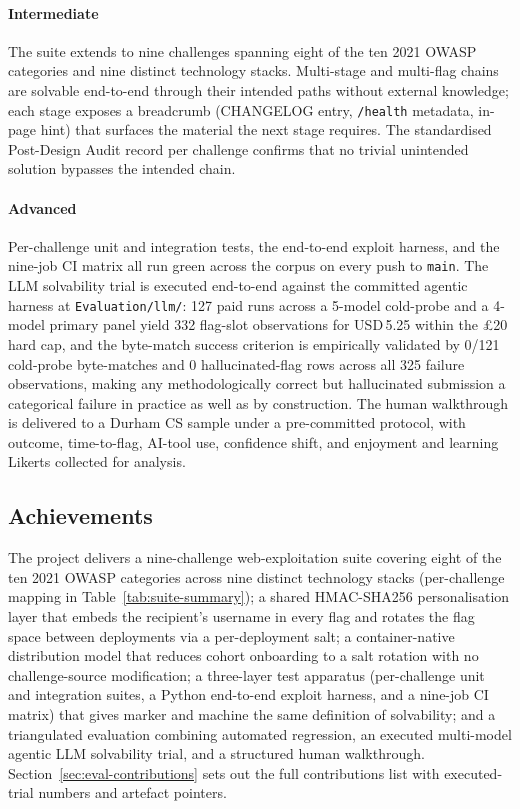 \paragraph{\textbf{Intermediate}} The suite extends to nine
challenges spanning eight of the ten 2021 OWASP categories
and nine distinct technology stacks. Multi-stage and multi-flag chains are
solvable end-to-end through their intended paths without external
knowledge; each stage exposes a breadcrumb (CHANGELOG entry,
\texttt{/health} metadata, in-page hint) that surfaces the material
the next stage requires. The standardised Post-Design Audit record
per challenge confirms that no trivial unintended solution bypasses
the intended chain.

\paragraph{\textbf{Advanced}} Per-challenge unit and integration
tests, the end-to-end exploit harness, and the nine-job CI matrix
all run green across the corpus on every push to \texttt{main}.
The LLM solvability trial is executed end-to-end against the
committed agentic harness at \texttt{Evaluation/llm/}: 127 paid
runs across a 5-model cold-probe and a 4-model primary panel
yield 332 flag-slot observations for USD\,5.25 within the
\pounds20 hard cap, and the byte-match success criterion is
empirically validated by 0/121 cold-probe byte-matches and 0
hallucinated-flag rows across all 325 failure observations,
making any methodologically correct but hallucinated submission
a categorical failure in practice as well as by construction.
The human walkthrough is delivered to a Durham CS
sample under a pre-committed protocol, with outcome,
time-to-flag, AI-tool use, confidence shift, and enjoyment and
learning Likerts collected for analysis.

\subsection{Achievements}

The project delivers a nine-challenge web-exploitation suite covering
eight of the ten 2021 OWASP categories across nine distinct
technology stacks (per-challenge mapping in
Table~\ref{tab:suite-summary}); a shared HMAC-SHA256 personalisation
layer that embeds the recipient's username in every flag and rotates
the flag space between deployments via a per-deployment salt; a
container-native distribution model that reduces cohort onboarding
to a salt rotation with no challenge-source modification; a
three-layer test apparatus (per-challenge unit and integration
suites, a Python end-to-end exploit harness, and a nine-job CI
matrix) that gives marker and machine the same definition of
solvability; and a triangulated evaluation combining automated
regression, an executed multi-model agentic LLM solvability trial,
and a structured human walkthrough.
Section~\ref{sec:eval-contributions} sets out the full
contributions list with executed-trial numbers and artefact
pointers.

